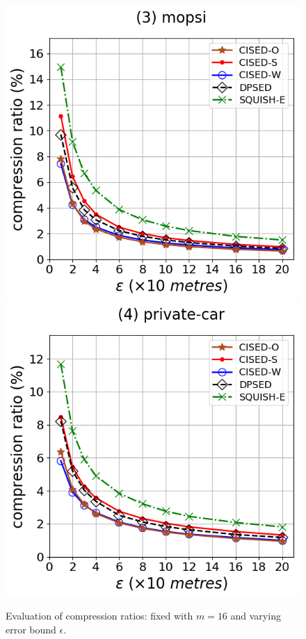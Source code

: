 \begin{figure}[tb!]
\includegraphics[scale = 0.3]{Figures/Exp-CR-epsilon-mopsi.png}
\includegraphics[scale = 0.3]{Figures/Exp-CR-epsilon-private.png}
\caption{\small Evaluation of compression ratios: fixed with $m=16$ and varying error bound $\epsilon$.}
\label{fig:cr-m16}
\end{figure}


